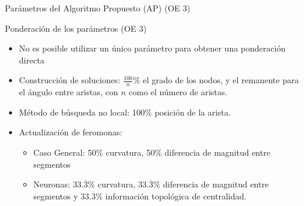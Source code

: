 \begin{frame}{Par\'ametros del Algoritmo Propuesto (AP) (OE 3)}
    \centering
\end{frame}

\begin{frame}{Ponderaci\'on de los par\'ametros (OE 3)}

    \begin{itemize}%
    \item No es posible utilizar un \'unico par\'ametro para obtener una ponderaci\'on directa
    \item Construcci\'on de soluciones: $\frac{100}{n}$\% el grado de los nodos, y el remanente para el \'angulo entre aristas, con $n$ como el n\'umero de aristas.
    \item M\'etodo de b\'usqueda no local: 100\% posici\'on de la arista.
    \item Actualizaci\'on de feromonas: 
    \begin{itemize}%
        \item Caso General: 50\% curvatura, 50\% diferencia de magnitud entre segmentos
        \item Neuronas: $33.\overline{3}\%$ curvatura, $33.\overline{3}\%$ diferencia de magnitud entre segmentos y $33.\overline{3}\%$ informaci\'on topol\'ogica de centralidad.
    \end{itemize}
\end{itemize}
\end{frame}

